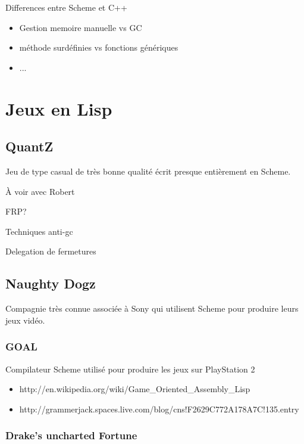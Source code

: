 \documentclass[12pt,oneside,letterpaper,francais]{book}
\begin{document}
Differences entre Scheme et C++
\begin{itemize}
\item Gestion memoire manuelle vs GC
\item méthode surdéfinies vs fonctions génériques
\item ...
\end{itemize}


\section{Jeux en Lisp}

\subsection{QuantZ}
Jeu de type \og casual \fg de très bonne qualité écrit presque
entièrement en Scheme.

À voir avec Robert

FRP?

Techniques anti-gc

Delegation de fermetures

\subsection{Naughty Dogz}
Compagnie très connue associée à Sony qui utilisent Scheme pour
produire leurs jeux vidéo.

\subsubsection{GOAL}
Compilateur Scheme utilisé pour produire les jeux sur PlayStation 2

\begin{itemize}
\item http://en.wikipedia.org/wiki/Game\_Oriented\_Assembly\_Lisp
\item http://grammerjack.spaces.live.com/blog/cns!F2629C772A178A7C!135.entry
\end{itemize}

\subsubsection{Drake's uncharted Fortune}

\end{document}
